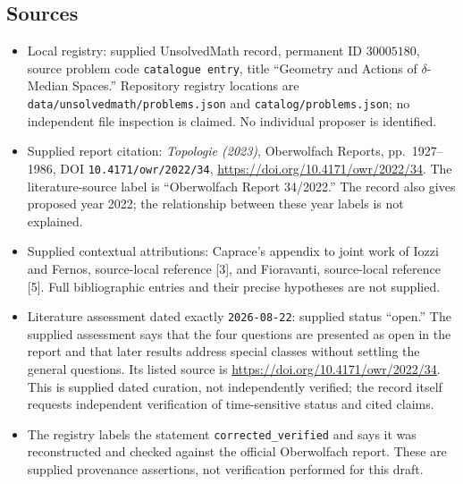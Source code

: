 \documentclass[11pt]{article}
\begin{document}
\subsection{Sources}
\begin{itemize}
\item Local registry: supplied UnsolvedMath record, permanent ID \(30005180\), source problem code \texttt{catalogue entry}, title ``Geometry and Actions of \(\delta\)-Median Spaces.'' Repository registry locations are \texttt{data/unsolvedmath/problems.json} and \texttt{catalog/problems.json}; no independent file inspection is claimed. No individual proposer is identified.
\item Supplied report citation: \emph{Topologie (2023)}, Oberwolfach Reports, pp.\ 1927--1986, DOI \texttt{10.4171/owr/2022/34}, \url{https://doi.org/10.4171/owr/2022/34}. The literature-source label is ``Oberwolfach Report 34/2022.'' The record also gives proposed year 2022; the relationship between these year labels is not explained.
\item Supplied contextual attributions: Caprace's appendix to joint work of Iozzi and Fernos, source-local reference [3], and Fioravanti, source-local reference [5]. Full bibliographic entries and their precise hypotheses are not supplied.
\item Literature assessment dated exactly \texttt{2026-08-22}: supplied status ``open.'' The supplied assessment says that the four questions are presented as open in the report and that later results address special classes without settling the general questions. Its listed source is \url{https://doi.org/10.4171/owr/2022/34}. This is supplied dated curation, not independently verified; the record itself requests independent verification of time-sensitive status and cited claims.
\item The registry labels the statement \texttt{corrected\_verified} and says it was reconstructed and checked against the official Oberwolfach report. These are supplied provenance assertions, not verification performed for this draft.
\end{itemize}
\end{document}
